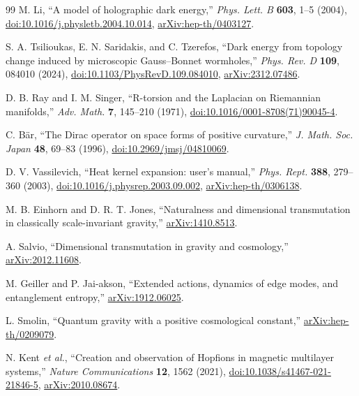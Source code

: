 \documentclass[aps,prd,reprint,nofootinbib,superscriptaddress,floatfix]{revtex4-2}
\numberwithin{equation}{section}
\theoremstyle{definition}
\theoremstyle{plain}
\begin{document}
\begin{thebibliography}{99}
M. Li,
``A model of holographic dark energy,''
\emph{Phys. Lett. B} \textbf{603}, 1--5 (2004),
\href{https://doi.org/10.1016/j.physletb.2004.10.014}{doi:10.1016/j.physletb.2004.10.014},
\href{https://arxiv.org/abs/hep-th/0403127}{arXiv:hep-th/0403127}.

S. A. Tsilioukas, E. N. Saridakis, and C. Tzerefos,
``Dark energy from topology change induced by microscopic Gauss--Bonnet wormholes,''
\emph{Phys. Rev. D} \textbf{109}, 084010 (2024),
\href{https://doi.org/10.1103/PhysRevD.109.084010}{doi:10.1103/PhysRevD.109.084010},
\href{https://arxiv.org/abs/2312.07486}{arXiv:2312.07486}.

D. B. Ray and I. M. Singer,
``R-torsion and the Laplacian on Riemannian manifolds,''
\emph{Adv. Math.} \textbf{7}, 145--210 (1971),
\href{https://doi.org/10.1016/0001-8708(71)90045-4}{doi:10.1016/0001-8708(71)90045-4}.


C. B\"ar,
``The Dirac operator on space forms of positive curvature,''
\emph{J. Math. Soc. Japan} \textbf{48}, 69--83 (1996),
\href{https://doi.org/10.2969/jmsj/04810069}{doi:10.2969/jmsj/04810069}.

D. V. Vassilevich,
``Heat kernel expansion: user's manual,''
\emph{Phys. Rept.} \textbf{388}, 279--360 (2003),
\href{https://doi.org/10.1016/j.physrep.2003.09.002}{doi:10.1016/j.physrep.2003.09.002},
\href{https://arxiv.org/abs/hep-th/0306138}{arXiv:hep-th/0306138}.


M. B. Einhorn and D. R. T. Jones,
``Naturalness and dimensional transmutation in classically scale-invariant gravity,''
\href{https://arxiv.org/abs/1410.8513}{arXiv:1410.8513}.

A. Salvio,
``Dimensional transmutation in gravity and cosmology,''
\href{https://arxiv.org/abs/2012.11608}{arXiv:2012.11608}.

M. Geiller and P. Jai-akson,
``Extended actions, dynamics of edge modes, and entanglement entropy,''
\href{https://arxiv.org/abs/1912.06025}{arXiv:1912.06025}.


L. Smolin,
``Quantum gravity with a positive cosmological constant,''
\href{https://arxiv.org/abs/hep-th/0209079}{arXiv:hep-th/0209079}.



N. Kent \emph{et al.},
``Creation and observation of Hopfions in magnetic multilayer systems,''
\emph{Nature Communications} \textbf{12}, 1562 (2021),
\href{https://doi.org/10.1038/s41467-021-21846-5}{doi:10.1038/s41467-021-21846-5},
\href{https://arxiv.org/abs/2010.08674}{arXiv:2010.08674}.


\end{thebibliography}
\end{document}
